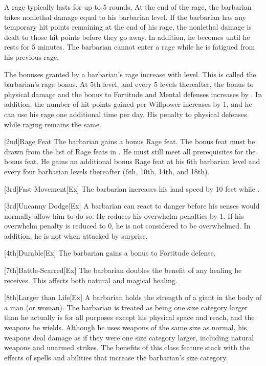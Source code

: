 A rage typically lasts for up to 5 rounds.
At the end of the rage, the barbarian takes nonlethal damage equal to his barbarian level.
If the barbarian has any temporary hit points remaining at the end of his rage, the nonlethal damage is dealt to those hit points before they go away.
In addition, he becomes \fatigued until he rests for 5 minutes.
The barbarian cannot enter a rage while he is fatigued from his previous rage.

The bonuses granted by a barbarian's rage increase with level.
This is called the barbarian's rage bonus.
At 5th level, and every 5 levels thereafter, the bonus to physical damage and the bonus to Fortitude and Mental defenses increases by .
In addition, the number of hit points gained per Willpower increases by 1, and he can use his rage one additional time per day.
His penalty to physical defenses while raging remains the same.

[2nd]{Rage Feat}
The barbarian gains a bonus Rage feat.
The bonus feat must be drawn from the list of Rage feats in .
He must still meet all prerequisites for the bonus feat.
He gains an additional bonus Rage feat at his 6th barbarian level and every four barbarian levels thereafter (6th, 10th, 14th, and 18th).

[3rd]{Fast Movement}[Ex]
The barbarian increases his land speed by 10 feet while \unencumbered.

[3rd]{Uncanny Dodge}[Ex]
A barbarian can react to danger before his senses would normally allow him to do so.
He reduces his overwhelm penalties by 1.
If his overwhelm penalty is reduced to 0, he is not considered to be overwhelmed.
In addition, he is not \unaware when attacked by surprise.

[4th]{Durable}[Ex]
The barbarian gains a  bonus to Fortitude defense.

[7th]{Battle-Scarred}[Ex]
The barbarian doubles the benefit of any healing he receives.
This affects both natural and magical healing.

[8th]{Larger than Life}[Ex]
A barbarian holds the strength of a giant in the body of a man (or woman).
The barbarian is treated as being one size category larger than he actually is for all purposes except his physical space and reach, and the weapons he wields.
Although he uses weapons of the same size as normal, his weapons deal damage as if they were one size category larger, including natural weapons and unarmed strikes.
The benefits of this class feature stack with the effects of spells and abilities that increase the barbarian's size category.

